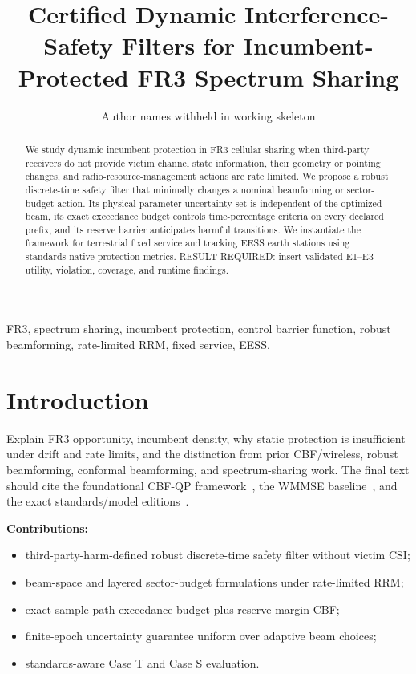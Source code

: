 \documentclass[journal]{IEEEtran}
\title{Certified Dynamic Interference-Safety Filters for Incumbent-Protected FR3 Spectrum Sharing}
\author{Author names withheld in working skeleton}
\begin{document}
\maketitle
\begin{abstract}
We study dynamic incumbent protection in FR3 cellular sharing when third-party receivers do not provide victim channel state information, their geometry or pointing changes, and radio-resource-management actions are rate limited. We propose a robust discrete-time safety filter that minimally changes a nominal beamforming or sector-budget action. Its physical-parameter uncertainty set is independent of the optimized beam, its exact exceedance budget controls time-percentage criteria on every declared prefix, and its reserve barrier anticipates harmful transitions. We instantiate the framework for terrestrial fixed service and tracking EESS earth stations using standards-native protection metrics. RESULT REQUIRED: insert validated E1--E3 utility, violation, coverage, and runtime findings.
\end{abstract}
\begin{IEEEkeywords}
FR3, spectrum sharing, incumbent protection, control barrier function, robust beamforming, rate-limited RRM, fixed service, EESS.
\end{IEEEkeywords}

\section{Introduction}
Explain FR3 opportunity, incumbent density, why static protection is insufficient under drift and rate limits, and the distinction from prior CBF/wireless, robust beamforming, conformal beamforming, and spectrum-sharing work. The final text should cite the foundational CBF-QP framework~\cite{ames2017cbf}, the WMMSE baseline~\cite{shi2011wmmse}, and the exact standards/model editions~\cite{3gpp38901,iturp452,iturp530,iturf758,itursa1027,ised3077}.

\textbf{Contributions:}
\begin{itemize}
\item third-party-harm-defined robust discrete-time safety filter without victim CSI;
\item beam-space and layered sector-budget formulations under rate-limited RRM;
\item exact sample-path exceedance budget plus reserve-margin CBF;
\item finite-epoch uncertainty guarantee uniform over adaptive beam choices;
\item standards-aware Case T and Case S evaluation.
\end{itemize}
\end{document}
